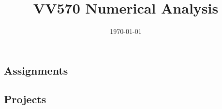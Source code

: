\documentclass[12pt,letterpaper]{book}
\title{{\textbf{VV570 Numerical Analysis}}}
\author{\href{http://www-personal.umich.edu/~yugtmath}{\calligra{Guangting Yu}}}
\date{\today}
\theoremstyle{definition}
\begin{document}
\begin{preview}
\part{Assignments}
\end{preview}
\begin{preview}

\end{preview}
\begin{preview}

\end{preview}
\begin{preview}

\end{preview}
\begin{preview}

\end{preview}
\begin{preview}

\end{preview}
\begin{preview}

\end{preview}
\begin{preview}

\end{preview}
\begin{preview}

\end{preview}
\begin{preview}
\part{Projects}
\end{preview}
\begin{preview}

\end{preview}
\begin{preview}
\printbibliography
\end{preview}
\end{document}
